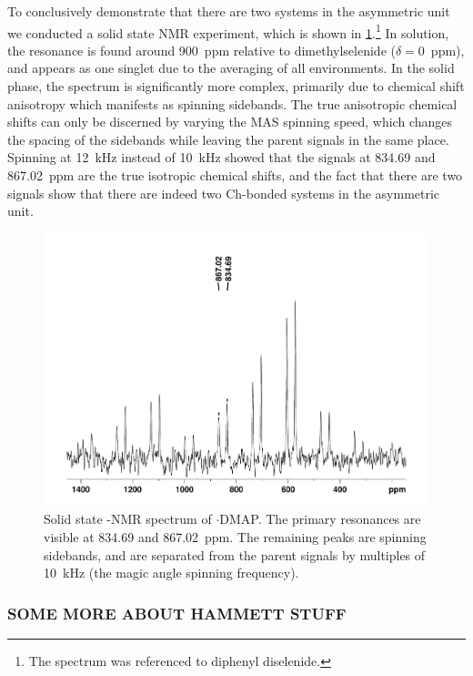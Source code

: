 \begin{refsection}
To conclusively demonstrate that there are two systems in the asymmetric unit we conducted a solid state  NMR experiment, which is shown in \cref{fig:cpmas-sol-77se}.\footnote{The  spectrum was referenced to diphenyl diselenide.}
In solution, the  resonance is found around 900~ppm relative to dimethylselenide ($\delta=$0~ppm), and appears as one singlet due to the averaging of all environments.
In the solid phase, the spectrum is significantly more complex, primarily due to chemical shift anisotropy which manifests as spinning sidebands.
The true anisotropic chemical shifts can only be discerned by varying the MAS spinning speed, which changes the spacing of the sidebands while leaving the parent signals in the same place.
Spinning at 12~kHz instead of 10~kHz showed that the signals at 834.69 and 867.02~ppm are the true isotropic chemical shifts, and the fact that there are two signals show that there are indeed two Ch-bonded systems in the asymmetric unit.

\begin{figure}
    \centering
    \includegraphics[width=0.7\linewidth]{Figures/ebs-4ome-dmap-cpmas-77se.pdf}
    \caption{Solid state -NMR spectrum of $\cdot$DMAP. The primary resonances are visible at 834.69 and 867.02~ppm. The remaining peaks are spinning sidebands, and are separated from the parent signals by multiples of 10~kHz (the magic angle spinning frequency).}
    \label{fig:cpmas-sol-77se}
\end{figure}

\subsubsection{SOME MORE ABOUT HAMMETT STUFF}


\end{refsection}
